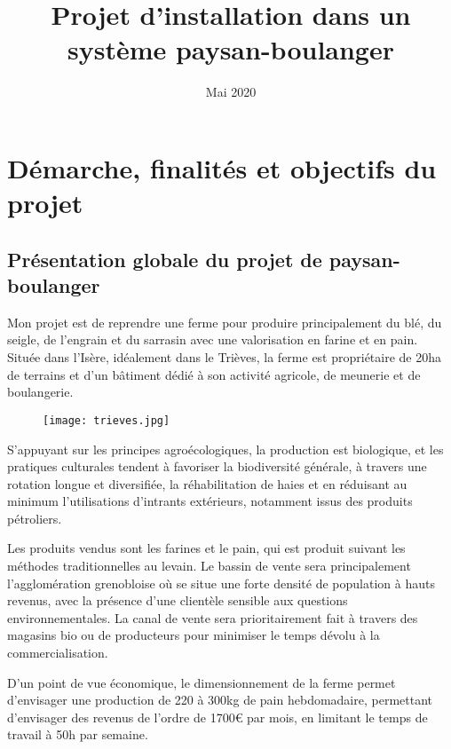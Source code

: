 \documentclass{book}
\title{Projet d'installation dans un système paysan-boulanger}
\date{Mai 2020}
\begin{document}
\maketitle

\tableofcontents

\chapter{Démarche, finalités et objectifs du projet}

\section{Présentation globale du projet de paysan-boulanger}

Mon projet est de reprendre une ferme pour produire principalement du blé, du seigle, de l'engrain et du sarrasin avec une valorisation en farine et en pain. Située dans l'Isère, idéalement dans le Trièves, la ferme est propriétaire de 20ha de terrains et d'un bâtiment dédié à son activité agricole, de meunerie et de boulangerie. 

\begin{figure}[h!]
\begin{center}
	\texttt{[image: trieves.jpg]}
\end{center}
\end{figure}

S'appuyant sur les principes agroécologiques, la production est biologique, et les pratiques culturales tendent à favoriser la biodiversité générale, à travers une rotation longue et diversifiée, la réhabilitation de haies et en réduisant au minimum l'utilisations d'intrants extérieurs, notamment issus des produits pétroliers.

Les produits vendus sont les farines et le pain, qui est produit suivant les méthodes traditionnelles au levain. Le bassin de vente sera principalement l'agglomération grenobloise où se situe une forte densité de population à hauts revenus, avec la présence d'une clientèle sensible aux questions environnementales. La canal de vente sera prioritairement fait à travers des magasins bio ou de producteurs pour minimiser le temps dévolu à la commercialisation.

D'un point de vue économique, le dimensionnement de la ferme permet d'envisager une production de 220 à 300kg de pain hebdomadaire, permettant d'envisager des revenus de l'ordre de 1700\euro{} par mois, en limitant le temps de travail à 50h par semaine. 
\end{document}
